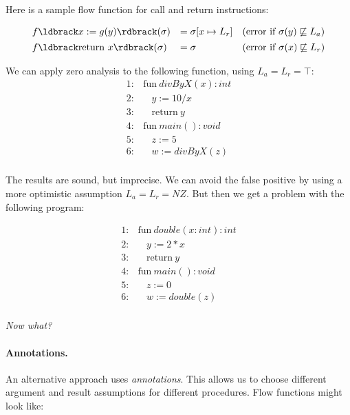 \documentclass[11pt]{article}
\begin{document}
Here is a sample flow function for call and return instructions:

\[
\begin{array}{lll}

f\parg{x := g(y)}(\sigma) & = \sigma[x \mapsto L_r] & (\mbox{error if}~ \sigma(y) \not\alap L_a) \\[1ex]
f\parg{\mbox{return}~ x}(\sigma) & = \sigma & (\mbox{error if}~ \sigma(x) \not\alap L_r) \\

\end{array}
\]

We can apply zero analysis to the following function, using $L_a = L_r = \top$: 
\\

\[
\begin{array}{ll}
1: & \mbox{fun}~ \textit{divByX}(x):int\\
2: & ~~~~y := 10 / x\\
3: & ~~~~\mbox{return}~ y\\[1ex]

4: & \mbox{fun}~ \textit{main}() : void\\
5: & ~~~~z := 5\\
6: & ~~~~w := \textit{divByX}(z)\\[1ex]
\end{array}
\]

The results are sound, but imprecise.  We can avoid the false positive by using a more optimistic assumption $L_a = L_r = NZ$.  But then we get a problem with the following program:

\[
\begin{array}{ll}
1: & \mbox{fun}~ \textit{double}(x:int):int\\
2: & ~~~~y := 2 * x\\
3: & ~~~~\mbox{return}~ y\\[1ex]

4: & \mbox{fun}~ \textit{main}() : void\\
5: & ~~~~z := 0\\
6: & ~~~~w := \textit{double}(z)\\[1ex]
\end{array}
\]

\noindent \emph{Now what?}


\paragraph{Annotations.} An alternative approach uses \emph{annotations}.  This allows us to choose different argument and result assumptions for different procedures.  Flow functions might look like:
\end{document}
